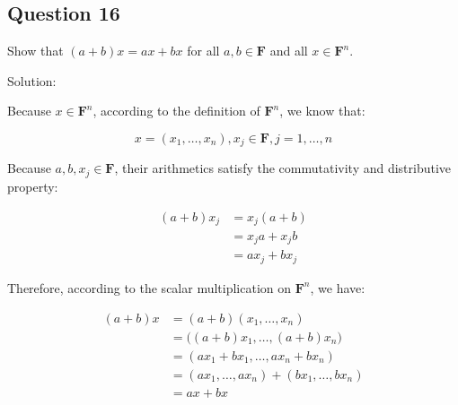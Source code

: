 \documentclass[12pt, letterpaper, oneside]{book}
\begin{document}
\subsection{Question 16}

Show that $(a + b)x = ax + bx$ for all $a, b \in \mathbf{F}$ and all $x \in
\mathbf{F}^n$.

Solution:

Because $x \in \mathbf{F}^n$, according to the definition of $\mathbf{F}^n$, we
know that:

\[ x = (x_1, \ldots, x_n), x_j \in \mathbf{F}, j = 1, \ldots, n \]

Because $a, b, x_j \in \mathbf{F}$, their arithmetics satisfy the commutativity
and distributive property:

\begin{equation*}
  \begin{split}
    (a + b)x_j
    & = x_j (a + b) \\
    & = x_j a + x_j b \\
    & = a x_j + b x_j
  \end{split}
\end{equation*}

Therefore, according to the scalar multiplication on $\mathbf{F}^n$, we have:

\begin{equation*}
  \begin{split}
    (a + b)x
    & = (a + b)(x_1, \ldots, x_n) \\
    & = \bigl((a + b)x_1, \ldots, (a + b)x_n\bigr) \\
    & = (a x_1 + b x_1, \ldots, a x_n + b x_n) \\
    & = (a x_1, \ldots, a x_n) + (b x_1, \ldots, b x_n) \\
    & = ax + bx
  \end{split}
\end{equation*}
\end{document}
